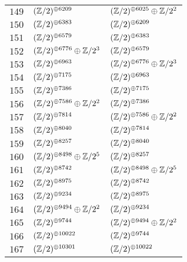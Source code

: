 \begin{supertabular}{|c|p{5.5cm}|p{5.5cm}|}
$149$%
&$(\mathbb{Z}/2)^{\oplus6209}$%
&$(\mathbb{Z}/2)^{\oplus6025}\oplus\mathbb{Z}/2^{2}$\\

$150$%
&$(\mathbb{Z}/2)^{\oplus6383}$%
&$(\mathbb{Z}/2)^{\oplus6209}$\\

$151$%
&$(\mathbb{Z}/2)^{\oplus6579}$%
&$(\mathbb{Z}/2)^{\oplus6383}$\\

$152$%
&$(\mathbb{Z}/2)^{\oplus6776}\oplus\mathbb{Z}/2^{3}$%
&$(\mathbb{Z}/2)^{\oplus6579}$\\

$153$%
&$(\mathbb{Z}/2)^{\oplus6963}$%
&$(\mathbb{Z}/2)^{\oplus6776}\oplus\mathbb{Z}/2^{3}$\\

$154$%
&$(\mathbb{Z}/2)^{\oplus7175}$%
&$(\mathbb{Z}/2)^{\oplus6963}$\\

$155$%
&$(\mathbb{Z}/2)^{\oplus7386}$%
&$(\mathbb{Z}/2)^{\oplus7175}$\\

$156$%
&$(\mathbb{Z}/2)^{\oplus7586}\oplus\mathbb{Z}/2^{2}$%
&$(\mathbb{Z}/2)^{\oplus7386}$\\

$157$%
&$(\mathbb{Z}/2)^{\oplus7814}$%
&$(\mathbb{Z}/2)^{\oplus7586}\oplus\mathbb{Z}/2^{2}$\\

$158$%
&$(\mathbb{Z}/2)^{\oplus8040}$%
&$(\mathbb{Z}/2)^{\oplus7814}$\\

$159$%
&$(\mathbb{Z}/2)^{\oplus8257}$%
&$(\mathbb{Z}/2)^{\oplus8040}$\\

$160$%
&$(\mathbb{Z}/2)^{\oplus8498}\oplus\mathbb{Z}/2^{5}$%
&$(\mathbb{Z}/2)^{\oplus8257}$\\

$161$%
&$(\mathbb{Z}/2)^{\oplus8742}$%
&$(\mathbb{Z}/2)^{\oplus8498}\oplus\mathbb{Z}/2^{5}$\\

$162$%
&$(\mathbb{Z}/2)^{\oplus8975}$%
&$(\mathbb{Z}/2)^{\oplus8742}$\\

$163$%
&$(\mathbb{Z}/2)^{\oplus9234}$%
&$(\mathbb{Z}/2)^{\oplus8975}$\\

$164$%
&$(\mathbb{Z}/2)^{\oplus9494}\oplus\mathbb{Z}/2^{2}$%
&$(\mathbb{Z}/2)^{\oplus9234}$\\

$165$%
&$(\mathbb{Z}/2)^{\oplus9744}$%
&$(\mathbb{Z}/2)^{\oplus9494}\oplus\mathbb{Z}/2^{2}$\\

$166$%
&$(\mathbb{Z}/2)^{\oplus10022}$%
&$(\mathbb{Z}/2)^{\oplus9744}$\\

$167$%
&$(\mathbb{Z}/2)^{\oplus10301}$%
&$(\mathbb{Z}/2)^{\oplus10022}$\\


\end{supertabular}
